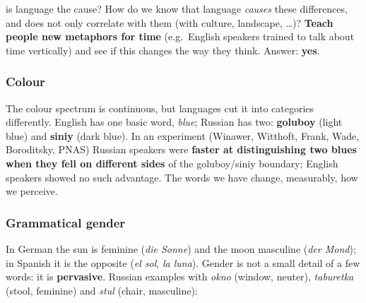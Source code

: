 \begin{nbfact}{is language the cause?}
How do we know that language \emph{causes} these differences, and does not only
correlate with them (with culture, landscape, \ldots)? \textbf{Teach people new
metaphors for time} (e.g.\ English speakers trained to talk about time vertically) and
see if this changes the way they think. Answer: \textbf{yes}.
\end{nbfact}

\subsubsection{Colour}

The colour spectrum is continuous, but languages cut it into categories differently.
English has one basic word, \emph{blue}; Russian has two: \textbf{goluboy} (light blue)
and \textbf{siniy} (dark blue). In an experiment (Winawer, Witthoft, Frank, Wade,
Boroditsky, PNAS) Russian speakers were \textbf{faster at distinguishing two blues when
they fell on different sides} of the goluboy/siniy boundary; English speakers showed no
such advantage. The words we have change, measurably, how we perceive.

\subsubsection{Grammatical gender}

In German the sun is feminine (\emph{die Sonne}) and the moon masculine (\emph{der
Mond}); in Spanish it is the opposite (\emph{el sol}, \emph{la luna}). Gender is not a
small detail of a few words: it is \textbf{pervasive}. Russian examples with \emph{okno}
(window, neuter), \emph{taburetka} (stool, feminine) and \emph{stul} (chair,
masculine):

